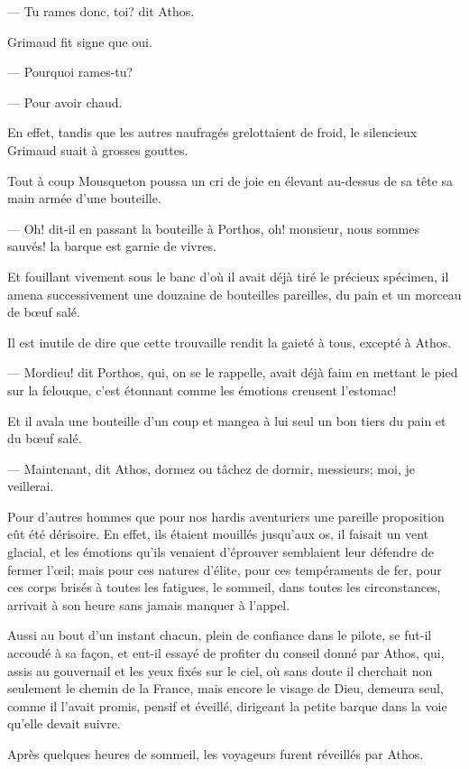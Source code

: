 — Tu rames donc, toi? dit Athos.

Grimaud fit signe que oui.

— Pourquoi rames-tu?

— Pour avoir chaud.

En effet, tandis que les autres naufragés grelottaient de froid, le silencieux Grimaud suait à grosses gouttes.

Tout à coup Mousqueton poussa un cri de joie en élevant au-dessus de sa tête sa main armée d'une bouteille.

— Oh! dit-il en passant la bouteille à Porthos, oh! monsieur, nous sommes sauvés! la barque est garnie de vivres.

Et fouillant vivement sous le banc d'où il avait déjà tiré le précieux spécimen, il amena successivement une douzaine de bouteilles pareilles, du pain et un morceau de bœuf salé.

Il est inutile de dire que cette trouvaille rendit la gaieté à tous, excepté à Athos.

— Mordieu! dit Porthos, qui, on se le rappelle, avait déjà faim en mettant le pied sur la felouque, c'est étonnant comme les émotions creusent l'estomac!

Et il avala une bouteille d'un coup et mangea à lui seul un bon tiers du pain et du bœuf salé.

— Maintenant, dit Athos, dormez ou tâchez de dormir, messieurs; moi, je veillerai.

Pour d'autres hommes que pour nos hardis aventuriers une pareille proposition eût été dérisoire. En effet, ils étaient mouillés jusqu'aux os, il faisait un vent glacial, et les émotions qu'ils venaient d'éprouver semblaient leur défendre de fermer l'œil; mais pour ces natures d'élite, pour ces tempéraments de fer, pour ces corps brisés à toutes les fatigues, le sommeil, dans toutes les circonstances, arrivait à son heure sans jamais manquer à l'appel.

Aussi au bout d'un instant chacun, plein de confiance dans le pilote, se fut-il accoudé à sa façon, et eut-il essayé de profiter du conseil donné par Athos, qui, assis au gouvernail et les yeux fixés sur le ciel, où sans doute il cherchait non seulement le chemin de la France, mais encore le visage de Dieu, demeura seul, comme il l'avait promis, pensif et éveillé, dirigeant la petite barque dans la voie qu'elle devait suivre.

Après quelques heures de sommeil, les voyageurs furent réveillés par Athos.

